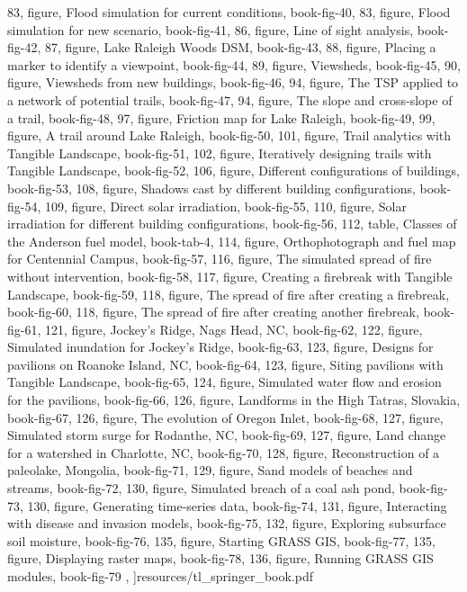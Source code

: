 \documentclass[11pt,          %
               phd,           %
               onehalfspacing %
               ]{ncsuthesis}
\begin{document}
{	83, figure, {Flood simulation for current conditions}, book-fig-40,
	83, figure, {Flood simulation for new scenario}, book-fig-41,
	86, figure, {Line of sight analysis}, book-fig-42,
	87, figure, {Lake Raleigh Woods DSM}, book-fig-43,
	88, figure, {Placing a marker to identify a viewpoint}, book-fig-44,
	89, figure, {Viewsheds}, book-fig-45,
	90, figure, {Viewsheds from new buildings}, book-fig-46,
	94, figure, {The TSP applied to a network of potential trails}, book-fig-47,
	94, figure, {The slope and cross-slope of a trail}, book-fig-48,
	97, figure, {Friction map for Lake Raleigh}, book-fig-49,
	99, figure, {A trail around Lake Raleigh}, book-fig-50,
	101, figure, {Trail analytics with Tangible Landscape}, book-fig-51,
	102, figure, {Iteratively designing trails with Tangible Landscape}, book-fig-52,
	106, figure, {Different configurations of buildings}, book-fig-53,
	108, figure, {Shadows cast by different building configurations}, book-fig-54,
	109, figure, {Direct solar irradiation}, book-fig-55,
	110, figure, {Solar irradiation for different building configurations}, book-fig-56,
	112, table, {Classes of the Anderson fuel model}, book-tab-4,
	114, figure, {Orthophotograph and fuel map for Centennial Campus}, book-fig-57,
	116, figure, {The simulated spread of fire without intervention}, book-fig-58,
	117, figure, {Creating a firebreak with Tangible Landscape}, book-fig-59,
	118, figure, {The spread of fire after creating a firebreak}, book-fig-60,
	118, figure, {The spread of fire after creating another firebreak}, book-fig-61,
	121, figure, {Jockey's Ridge, Nags Head, NC}, book-fig-62,
	122, figure, {Simulated inundation for Jockey's Ridge}, book-fig-63,
	123, figure, {Designs for pavilions on Roanoke Island, NC}, book-fig-64,
	123, figure, {Siting pavilions with Tangible Landscape}, book-fig-65,
	124, figure, {Simulated water flow and erosion for the pavilions}, book-fig-66,
	126, figure, {Landforms in the High Tatras, Slovakia}, book-fig-67,
	126, figure, {The evolution of Oregon Inlet}, book-fig-68,
	127, figure, {Simulated storm surge for Rodanthe, NC}, book-fig-69,
	127, figure, {Land change for a watershed in Charlotte, NC}, book-fig-70,
	128, figure, {Reconstruction of a paleolake, Mongolia}, book-fig-71,
	129, figure, {Sand models of beaches and streams}, book-fig-72,
	130, figure, {Simulated breach of a coal ash pond}, book-fig-73,
	130, figure, {Generating time-series data}, book-fig-74,
	131, figure, {Interacting with disease and invasion models}, book-fig-75,
	132, figure, {Exploring subsurface soil moisture}, book-fig-76,
	135, figure, {Starting GRASS GIS}, book-fig-77,
	135, figure, {Displaying raster maps}, book-fig-78,
	136, figure, {Running GRASS GIS modules}, book-fig-79
	},
]{resources/tl_springer_book.pdf}
\end{document}
